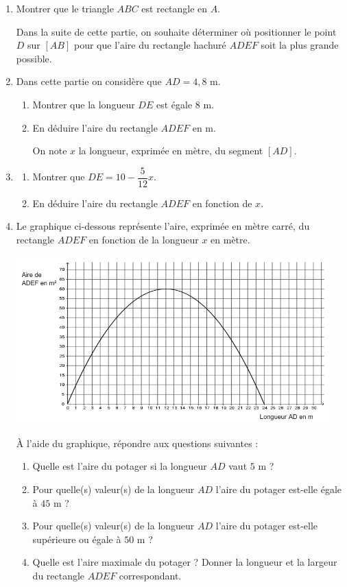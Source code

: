 \begin{enumerate}
    \item Montrer que le triangle $ABC$ est rectangle en $A$.
    
    Dans la suite de cette partie, on souhaite déterminer où positionner le point $D$ sur $[AB]$ pour
    que l’aire du rectangle hachuré $ADEF$ soit la plus grande possible.
    \item Dans cette partie on considère que $AD = 4,8$ m.
    \begin{enumerate}
        \item Montrer que la longueur $DE$ est égale $8$ m.
        \item En déduire l'aire du rectangle $ADEF$ en m.
        
        On note $x$ la longueur, exprimée en mètre, du segment $[AD]$.
    \end{enumerate}
    \item 
    \begin{enumerate}
        \item Montrer que $DE = 10 -\dfrac{5}{12}x$.
        \item En déduire l'aire du rectangle $ADEF$ en fonction de $x$.
    \end{enumerate}
    \clearpage
    \item Le graphique ci-dessous représente l'aire, exprimée en mètre carré, du rectangle $ADEF$
    en fonction de la longueur $x$ en mètre.
    \begin{center}
        \includegraphics[width=0.95\textwidth]{./images/2022-g3-ex3-img1.png}
    \end{center}

    À l'aide du graphique, répondre aux questions suivantes :
    \begin{enumerate}
        \item Quelle est l'aire du potager si la longueur $AD$ vaut $5$ m ?
        \item Pour quelle(s) valeur(s) de la longueur $AD$ l'aire du potager est-elle égale à $45$ m ?
        \item Pour quelle(s) valeur(s) de la longueur $AD$ l'aire du potager est-elle supérieure ou égale à $50$ m ?
        \item Quelle est l’aire maximale du potager ? Donner la longueur et la largeur du rectangle $ADEF$ correspondant.
    \end{enumerate}
\end{enumerate}

